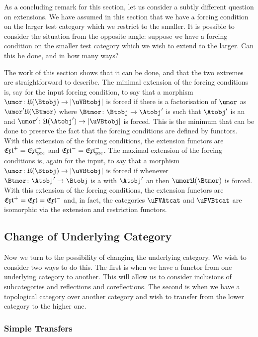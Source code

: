 \documentclass[%
a4paper,%
arxiv,%
defaults
]{myclass}
\begin{document}
As a concluding remark for this section, let us consider a subtly different question on extensions.
We have assumed in this section that we have a forcing condition on the larger test category which we restrict to the smaller.
It is possible to consider the situation from the opposite angle: suppose we have a forcing condition on the smaller test category which we wish to extend to the larger.
Can this be done, and in how many ways?

The work of this section shows that it can be done, and that the two extremes are straightforward to describe.
The minimal extension of the forcing conditions is, say for the input forcing condition, to say that a morphism \(\umor \colon \ufunc(\Btobj) \to \forfunc[\uVBtobj]\) is forced if there is a factorisation of \(\umor\) as \(\umor' \ufunc(\Btmor)\) where \(\Btmor \colon \Btobj \to \Atobj'\) is such that \(\Atobj'\) is an \Atobjalt and \(\umor' \colon \ufunc(\Atobj') \to \forfunc[\uVBtobj]\) is forced.
This is the minimum that can be done to preserve the fact that the forcing conditions are defined by functors.
With this extension of the forcing conditions, the extension functors are \(\Jextfunc = \PJextfunc\) and \(\Mextfunc = \PMextfunc\).
The maximal extension of the forcing conditions is, again for the input, to say that a morphism \(\umor \colon \ufunc(\Btobj) \to \forfunc[\uVBtobj]\) is forced if whenever \(\Btmor \colon \Atobj' \to \Btobj\) is a \Btmor with \(\Atobj'\) an \Atobjalt then \(\umor \ufunc(\Btmor)\) is forced.
With this extension of the forcing conditions, the extension functors are \(\Jextfunc = \extfunc = \Mextfunc\) and, in fact, the categories \(\uFVAtcat\) and \(\uFVBtcat\) are isomorphic via the extension and restriction functors.

\subsection{Change of Underlying Category}

Now we turn to the possibility of changing the underlying category.
We wish to consider two ways to do this.
The first is when we have a functor from one underlying category to another.
This will allow us to consider inclusions of subcategories and reflections and coreflections.
The second is when we have a topological category over another category and wish to transfer \uFVtobjs from the lower category to the higher one.

\subsubsection{Simple Transfers}
\end{document}
